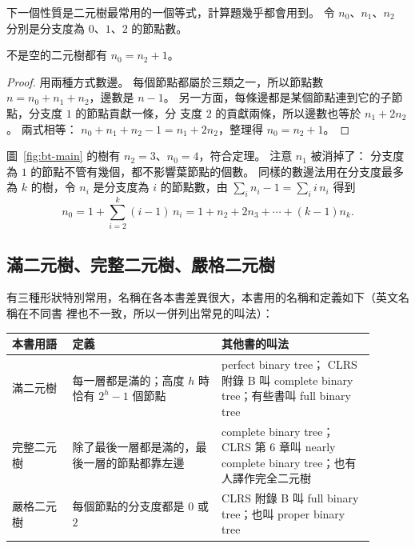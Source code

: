 下一個性質是二元樹最常用的一個等式，計算題幾乎都會用到。 令 $n_0$、$n_1$、$n_2$ 分別是分支度為
$0$、$1$、$2$ 的節點數。

\begin{theorem}
\label{thm:bt-n0n2}
不是空的二元樹都有 $n_0 = n_2 + 1$。
\end{theorem}

\begin{proof}
用兩種方式數邊。 每個節點都屬於三類之一，所以節點數 $n = n_0 + n_1 + n_2$，邊數是
$n - 1$。 另一方面，每條邊都是某個節點連到它的子節點，分支度 $1$ 的節點貢獻一條，分
支度 $2$ 的貢獻兩條，所以邊數也等於 $n_1 + 2 n_2$。 兩式相等：
$n_0 + n_1 + n_2 - 1 = n_1 + 2 n_2$，整理得 $n_0 = n_2 + 1$。
\end{proof}

圖~\ref{fig:bt-main} 的樹有 $n_2 = 3$、$n_0 = 4$，符合定理。 注意 $n_1$ 被消掉了：
分支度為 $1$ 的節點不管有幾個，都不影響葉節點的個數。 同樣的數邊法用在分支度最多
為 $k$ 的樹，令 $n_i$ 是分支度為 $i$ 的節點數，由
$\sum_i n_i - 1 = \sum_i i\, n_i$ 得到
\[
n_0 = 1 + \sum_{i=2}^{k} (i - 1)\, n_i = 1 + n_2 + 2 n_3 + \cdots + (k - 1) n_k .
\]

\subsection{滿二元樹、完整二元樹、嚴格二元樹}

有三種形狀特別常用，名稱在各本書差異很大，本書用的名稱和定義如下（英文名稱在不同書
裡也不一致，所以一併列出常見的叫法）：

\begin{center}
\begin{tabular}{p{0.15\linewidth}p{0.37\linewidth}>{\raggedright\arraybackslash}p{0.38\linewidth}}
\toprule
本書用語 & 定義 & 其他書的叫法 \\
\midrule
滿二元樹 & 每一層都是滿的；高度 $h$ 時恰有 $2^h - 1$ 個節點 & perfect binary tree；
CLRS 附錄 B 叫 complete binary tree；有些書叫 full binary tree \\
完整二元樹 & 除了最後一層都是滿的，最後一層的節點都靠左邊 & complete binary tree；
CLRS 第 6 章叫 nearly complete binary tree；也有人譯作完全二元樹 \\
嚴格二元樹 & 每個節點的分支度都是 $0$ 或 $2$ & CLRS 附錄 B 叫 full binary tree；也叫
proper binary tree \\
\bottomrule
\end{tabular}
\end{center}


